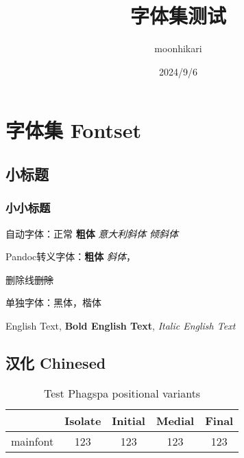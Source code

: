 \documentclass{article}
\let\kaiti=\kaishu
\newcommand*{\sout}[1]{\st{#1}}
\begin{document}
\title{ \Huge \heiti 字体集测试}
\author{moonhikari}
\date{2024/9/6}
\maketitle

\tableofcontents

\section{字体集 Fontset}

\subsection{小标题}

\subsubsection{小小标题}

自动字体：正常 \textbf{粗体} \textit{意大利斜体}  \textsl{倾斜体} 

Pandoc转义字体：\textbf{粗体} \emph{斜体}，

删除线\sout{删除}

单独字体：{\heiti 黑体}，{\kaiti 楷体}

English Text, \textbf{Bold English Text}, \textit{Italic English Text}

\subsection{汉化 Chinesed}

\begin{table}[htbp]
  \caption{Test Phagspa positional variants}
  \centering
  \begin{tabular}{r|cccc}
      \hline
       & Isolate & Initial & Medial & Final\\
       \hline
      mainfont & 123 & 123 & 123 & 123\\
      \hline
  \end{tabular}
  
  \label{tab:my_label}
\end{table}
\end{document}
